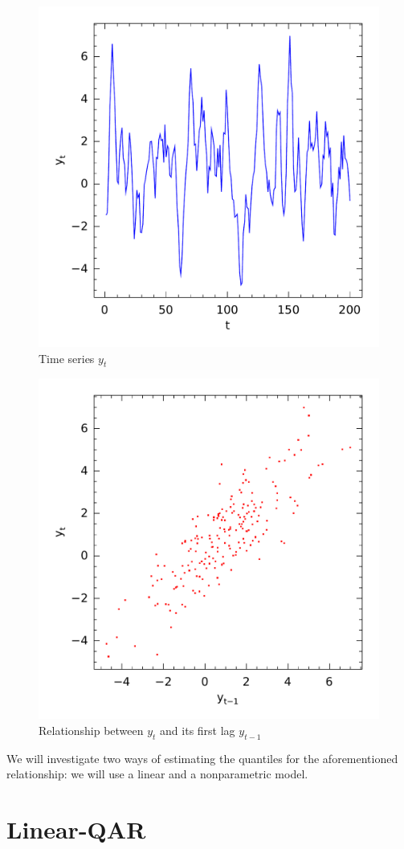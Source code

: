 \documentclass[a4paper]{IEEEtran}
\begin{document}
\begin{figure}[h]
\centering
\includegraphics[width=0.7\linewidth]{Figuras/exemplo-yt}
\caption{Time series $y_t$}
\label{fig:exemployt}
\end{figure}

\begin{figure}[h]
\centering
\includegraphics[width=0.7\linewidth]{Figuras/exemplo-ar}
\caption[Tst]{Relationship between $y_t$ and its first lag $y_{t-1}$}
\label{fig:exemploar}
\end{figure}

We will investigate two ways of estimating the quantiles for the aforementioned relationship: we will use a linear and a nonparametric model.

\section{Linear-QAR}
\end{document}
